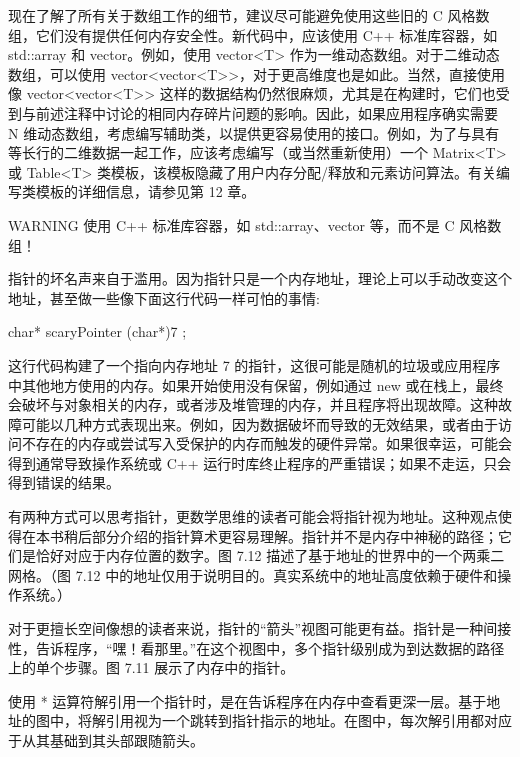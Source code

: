 现在了解了所有关于数组工作的细节，建议尽可能避免使用这些旧的 C 风格数组，它们没有提供任何内存安全性。新代码中，应该使用 C++ 标准库容器，如 std::array 和 vector。例如，使用 vector<T> 作为一维动态数组。对于二维动态数组，可以使用 vector<vector<T>{}>，对于更高维度也是如此。当然，直接使用像 vector<vector<T>{}> 这样的数据结构仍然很麻烦，尤其是在构建时，它们也受到与前述注释中讨论的相同内存碎片问题的影响。因此，如果应用程序确实需要 N 维动态数组，考虑编写辅助类，以提供更容易使用的接口。例如，为了与具有等长行的二维数据一起工作，应该考虑编写（或当然重新使用）一个 Matrix<T> 或 Table<T> 类模板，该模板隐藏了用户内存分配/释放和元素访问算法。有关编写类模板的详细信息，请参见第 12 章。

\begin{myWarning}{WARNING}
使用 C++ 标准库容器，如 std::array、vector 等，而不是 C 风格数组！
\end{myWarning}


指针的坏名声来自于滥用。因为指针只是一个内存地址，理论上可以手动改变这个地址，甚至做一些像下面这行代码一样可怕的事情:

\begin{cpp}
char* scaryPointer { (char*)7 };
\end{cpp}

这行代码构建了一个指向内存地址 7 的指针，这很可能是随机的垃圾或应用程序中其他地方使用的内存。如果开始使用没有保留，例如通过 new 或在栈上，最终会破坏与对象相关的内存，或者涉及堆管理的内存，并且程序将出现故障。这种故障可能以几种方式表现出来。例如，因为数据破坏而导致的无效结果，或者由于访问不存在的内存或尝试写入受保护的内存而触发的硬件异常。如果很幸运，可能会得到通常导致操作系统或 C++ 运行时库终止程序的严重错误；如果不走运，只会得到错误的结果。


有两种方式可以思考指针，更数学思维的读者可能会将指针视为地址。这种观点使得在本书稍后部分介绍的指针算术更容易理解。指针并不是内存中神秘的路径；它们是恰好对应于内存位置的数字。图 7.12 描述了基于地址的世界中的一个两乘二网格。（图 7.12 中的地址仅用于说明目的。真实系统中的地址高度依赖于硬件和操作系统。）


对于更擅长空间像想的读者来说，指针的“箭头”视图可能更有益。指针是一种间接性，告诉程序，“嘿！看那里。”在这个视图中，多个指针级别成为到达数据的路径上的单个步骤。图 7.11 展示了内存中的指针。

使用 * 运算符解引用一个指针时，是在告诉程序在内存中查看更深一层。基于地址的图中，将解引用视为一个跳转到指针指示的地址。在图中，每次解引用都对应于从其基础到其头部跟随箭头。

